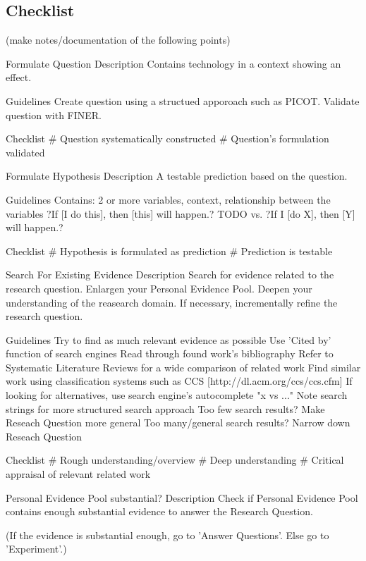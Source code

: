
\newpage
\subsection{Checklist}

(make notes/documentation of the following points)

Formulate Question
	Description
		Contains technology in a context showing an effect.
	
	Guidelines
		Create question using a structued apporoach such as PICOT. 
		Validate question with FINER.
	
	Checklist
		\# Question systematically constructed
		\# Question's formulation validated			
				
				
Formulate Hypothesis
	Description
		A testable prediction based on the question.

	Guidelines
		Contains: 2 or more variables, context, relationship between the variables
		?If [I do this], then [this] will happen.? TODO vs. ?If I [do X], then [Y] will happen.?
		
	Checklist
		\# Hypothesis is formulated as prediction
		\# Prediction is testable
		
		
Search For Existing Evidence
	Description
		Search for evidence related to the research question.
		Enlargen your Personal Evidence Pool.
		Deepen your understanding of the reasearch domain.
		If necessary, incrementally refine the research question.
	
	Guidelines
		Try to find as much relevant evidence as possible
		Use 'Cited by' function of search engines
		Read through found work's bibliography
		Refer to Systematic Literature Reviews for a wide comparison of related work
		Find similar work using classification systems such as CCS [http://dl.acm.org/ccs/ccs.cfm]
		If looking for alternatives, use search engine's autocomplete "x vs ..."
		Note search strings for more structured search approach
		Too few search results? Make Reseach Question more general
		Too many/general search results? Narrow down Reseach Question
		
	Checklist
		\# Rough understanding/overview
		\# Deep understanding
		\# Critical appraisal of relevant related work
	

Personal Evidence Pool substantial?
	Description
		Check if Personal Evidence Pool contains enough substantial evidence
		to answer the Research Question.
		
		(If the evidence is substantial enough, go to 'Answer Questions'.
		Else go to 'Experiment'.)
	
